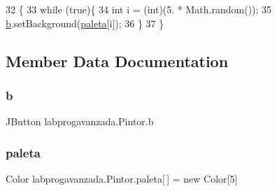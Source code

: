 \begin{DoxyCode}
32                      \{
33           \textcolor{keywordflow}{while} (\textcolor{keyword}{true})\{
34             \textcolor{keywordtype}{int} i = (int)(5. * Math.random());
35             \mbox{\hyperlink{classlabprogavanzada_1_1_pintor_a171f3004a9b9e99f64e81de4c1257d6f}{b}}.setBackground(\mbox{\hyperlink{classlabprogavanzada_1_1_pintor_aa726e5f94f03e7e1ee20eb9995e368e5}{paleta}}[i]);
36         \}
37     \}
\end{DoxyCode}


\subsection{Member Data Documentation}
\mbox{\label{classlabprogavanzada_1_1_pintor_a171f3004a9b9e99f64e81de4c1257d6f}} 
\subsubsection{\texorpdfstring{b}{b}}
{\footnotesize\ttfamily J\+Button labprogavanzada.\+Pintor.\+b\hspace{0.3cm}{\ttfamily [package]}}

\mbox{\label{classlabprogavanzada_1_1_pintor_aa726e5f94f03e7e1ee20eb9995e368e5}} 
\subsubsection{\texorpdfstring{paleta}{paleta}}
{\footnotesize\ttfamily Color labprogavanzada.\+Pintor.\+paleta\mbox{[}$\,$\mbox{]} = new Color\mbox{[}5\mbox{]}\hspace{0.3cm}{\ttfamily [package]}}

